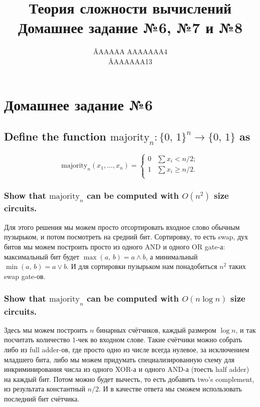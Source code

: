 \documentclass{article}
\title{Теория сложности вычислений \\ Домашнее задание №6, №7 и №8}
\author{\AA{AAAAA AAAAAAA}{4} \\ \AA{AAAAAA}{13}}
\begin{document}
  \maketitle

  \setcounter{section}{5}
  \section{Домашнее задание №6}
  \setcounter{subsection}{8}
  \subsection{Define the function $\mathrm{majority}_n: \{0,\, 1\}^n \to \{0,\, 1\}$ as}
  $$\mathrm{majority}_n(x_1,\dots,x_n) = \begin{cases}
    0 & \sum x_i < n/2;\\
    1 & \sum x_i \geq n/2.\\
  \end{cases}$$
  \subsubsection{Show that $\mathrm{majority}_n$ can be computed with $O(n^2)$ size circuits.}
  Для этого решения мы можем просто отсортировать входное слово обычным пузырьком, и потом посмотреть на средний бит.
  Сортировку, то есть swap, дух битов мы можем построить просто из одного AND и одного OR gate-а:
  максимальный бит будет $\max(a,\, b) = a \land b$, а минимальный $\min(a,\, b) = a \lor b$.
  И для сортировки пузырьком нам понадобиться $n^2$ таких swap gate-ов.

  \subsubsection{Show that $\mathrm{majority}_n$ can be computed with $O(n\log n)$ size circuits.}
  Здесь мы можем построить $n$ бинарных счётчиков, каждый размером $\log n$, и так посчитать количество $1$-чек во входном слове.
  Такие счётчики можно собрать либо из full adder-ов, где просто одно из числе всегда нулевое, за исключением младшего бита, либо мы можем придумать специализированную схему для инкриминирования числа из одного XOR-а и одного AND-а (тоесть half adder) на каждый бит.
  Потом можно будет вычесть, то есть добавить two's complement, из результата константный $n/2$.
  И в качестве ответа мы сможем использовать последний бит счётчика.
\end{document}
